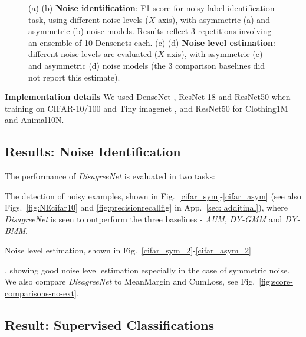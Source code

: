 \documentclass{article}
\newcommand{\myparagraph}[1]{\smallskip\noindent\textbf{#1}}
\begin{document}
\begin{figure}[b!]
    \caption[Estimation]{(a)-(b) \textbf{Noise identification}: F1 score for noisy label identification task, using different noise levels ($X$-axis), with asymmetric (a) and asymmetric (b) noise models. Results reflect  3 repetitions involving an ensemble of 10 Densenets each. (c)-(d) \textbf{Noise level estimation}: different noise levels are evaluated ($X$-axis), with asymmetric (c) and asymmetric (d) noise models (the 3 comparison baselines did not report this estimate).}
     \vspace{-1.0em}
\end{figure}

\myparagraph{Implementation details} We used DenseNet \citep{iandola2014densenet}, ResNet-18 and ResNet50 \citep{he2016deep}  when training on CIFAR-10/100 and Tiny imagenet , and ResNet50 for Clothing1M and Animal10N.


\vspace{-.4em}
\subsection{Results: Noise Identification}
\label{sec:noise-identification}
\vspace{-.4em}

The performance of \emph{DisagreeNet} is evaluated in two tasks: \begin{inparaenum}[(i)] \item The detection of noisy examples, shown in Fig.~\ref{cifar_sym}-\ref{cifar_asym} (see also Figs.~\ref{fig:NEcifar10} and \ref{fig:precisionrecallfig} in App.~\ref{sec: additinal}), where \emph{DisagreeNet} is seen to outperform the three baselines - \emph{AUM}, \emph{DY-GMM} and \emph{DY-BMM}. \item Noise level estimation, shown in Fig.~\ref{cifar_sym_2}-\ref{cifar_asym_2}\end{inparaenum}, showing good noise level estimation especially in the case of symmetric noise. We also compare \emph{DisagreeNet} to MeanMargin and CumLoss, see Fig.~\ref{fig:score-comparisons-no-ext}.

\vspace{-.4em}
\subsection{Result: Supervised Classifications}%
\label{sec:supervised}
\vspace{-.4em}
\end{document}
